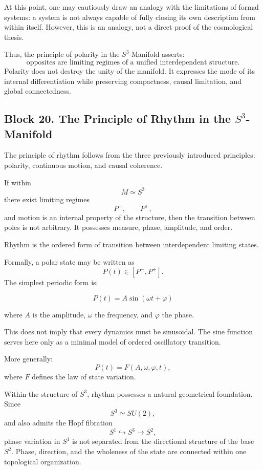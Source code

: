 \documentclass[12pt,a4paper]{article}
\theoremstyle{definition}
\begin{document}
At this point, one may cautiously draw an analogy with the limitations of formal systems: a system is not always capable of fully closing its own description from within itself. However, this is an analogy, not a direct proof of the cosmological thesis.

Thus, the principle of polarity in the \(S^3\)-Manifold asserts:
\[
\text{opposites are limiting regimes of a unified interdependent structure.}
\]
Polarity does not destroy the unity of the manifold. It expresses the mode of its internal differentiation while preserving compactness, causal limitation, and global connectedness.



\subsection{Block 20. The Principle of Rhythm in the \(S^3\)-Manifold}
The principle of rhythm follows from the three previously introduced principles: polarity, continuous motion, and causal coherence.

If within
\[
M\simeq S^3
\]
there exist limiting regimes
\[
P^-,
\qquad
P^+,
\]
and motion is an internal property of the structure, then the transition between poles is not arbitrary. It possesses measure, phase, amplitude, and order.

Rhythm is the ordered form of transition between interdependent limiting states.

Formally, a polar state may be written as
\[
P(t)\in[P^-,P^+].
\]
The simplest periodic form is:

\[
P(t)=A\sin(\omega t+\varphi)
\]

where \(A\) is the amplitude, \(\omega\) the frequency, and \(\varphi\) the phase.

This does not imply that every dynamics must be sinusoidal. The sine function serves here only as a minimal model of ordered oscillatory transition.

More generally:
\[
P(t)=F(A,\omega,\varphi,t),
\]
where \(F\) defines the law of state variation.

Within the structure of \(S^3\), rhythm possesses a natural geometrical foundation. Since
\[
S^3\simeq SU(2),
\]
and also admits the Hopf fibration
\[
S^1\hookrightarrow S^3\to S^2,
\]
phase variation in \(S^1\) is not separated from the directional structure of the base \(S^2\). Phase, direction, and the wholeness of the state are connected within one topological organization.
\end{document}
